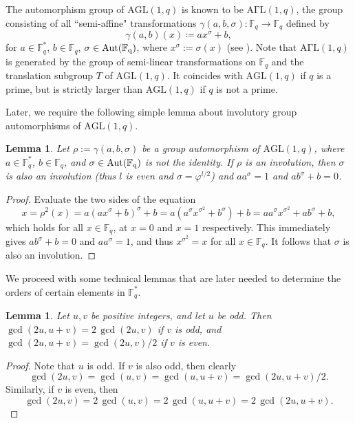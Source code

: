 \documentclass[12pt]{article}
\newtheorem{lemma}[theorem]{Lemma}
\theoremstyle{definition}\newtheorem{definition}{Definition}[section]
\begin{document}
The automorphism group of $\mathrm{AGL}(1,q)$ is known to be $\mathrm{A\Gamma L}(1,q)$, the group consisting of all ``semi-affine" transformations $\gamma(a,b,\sigma): \mathbb{F}_q \rightarrow \mathbb{F}_q$ defined by
\[ \gamma(a,b)(x) \coloneqq  a x^{\sigma}+b,\]
for $a\in\mathbb{F}_q^*$, $b\in\mathbb{F}_q$, $\sigma\in\rm{Aut}(\mathbb{F}_q)$, where $x^{\sigma}:=\sigma(x)$ (see \cite[p.~98]{AK1992}). Note that $\mathrm{A\Gamma L}(1,q)$ is generated by the group of semi-linear transformations on $\mathbb{F}_q$ and the translation subgroup $T$ of $\mathrm{AGL}(1,q)$. It coincides with $\mathrm{AGL}(1,q)$ if $q$ is a prime, but is strictly larger than $\mathrm{AGL}(1,q)$ if $q$ is not a prime. 
\smallskip

Later, we require the following simple lemma about involutory group automorphisms of $\mathrm{AGL}(1,q)$. 

\begin{lemma}
\label{invgrauts}
Let $\rho:=\gamma(a,b,\sigma)$ be a group automorphism of $\mathrm{AGL}(1,q)$, where $a\in\mathbb{F}_q^*$, $b\in\mathbb{F}_q$, and $\sigma\in\rm{Aut}(\mathbb{F}_q)$ is not the identity. If $\rho$ is an involution, then $\sigma$ is also an involution (thus $l$ is even and $\sigma=\varphi^{l/2}$)
and $aa^{\sigma} = 1$ and $ab^\sigma +b=0$. \end{lemma}

\begin{proof}
Evaluate the two sides of the equation
\[x = \rho^2(x) = a(a x^{\sigma}+b)^\sigma +b = a(a^\sigma x^{\sigma^2}+b^\sigma) + b
=aa^\sigma x^{\sigma^2}+ab^\sigma +b,\]
which holds for all $x\in\mathbb{F}_q$, at $x=0$ and $x=1$ respectively. This immediately gives $ab^\sigma +b=0$ and $aa^\sigma=1$, and thus $x^{\sigma^2}=x$ for all $x\in\mathbb{F}_q$. It follows that $\sigma$ is also an involution.
\end{proof}
\bigskip

We proceed with some technical lemmas that are later needed to determine the orders of certain elements in $\mathbb{F}_q^*$.

\begin{lemma}
\label{div1}
Let $u,v$ be positive integers, and let $u$ be odd. Then 
$\gcd(2u,u+v) = 2\,\gcd(2u,v)$ if $v$ is odd, and
$\gcd(2u,u+v)=\gcd(2u,v)/2$ if $v$ is even. 
\end{lemma}

\begin{proof}
Note that $u$ is odd. If $v$ is also odd, then clearly 
\[\gcd(2u,v) = \gcd(u,v) = \gcd(u,u+v) = \gcd(2u,u+v)/2.\]
Similarly, if $v$ is even, then 
\[\gcd(2u,v) = 2\,\gcd(u,v) = 2\,\gcd(u,u+v) = 2\,\gcd(2u,u+v).\] 
\end{proof}
\smallskip
\end{document}
